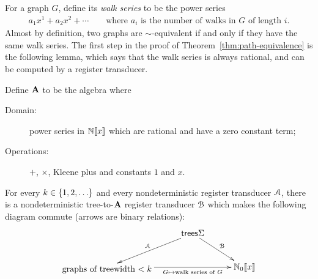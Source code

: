 For a graph $G$, define its \emph{walk series} to be the power series 
\begin{align*}
  a_1 x^1 + a_2x^2 + \cdots \qquad \text{where $a_i$ is the number of walks in $G$ of length $i$.}
\end{align*}
Almost by definition, two graphs are $\sim$-equivalent if and only if they have the same walk series. 
The first step in the proof of Theorem~\ref{thm:path-equivalence} is the following lemma, which says  that the walk series is always  rational, and can be computed by a register transducer.
\begin{lemma}\label{lem:compute-power-series}    
    Define  $\mathbf{A}$ to be the  algebra where
    \begin{description}
        \item[Domain:]power series in $\mathbb N [\![x]\!]$ which are rational and have a  zero constant term;
        \item[Operations:] $+$, $\times$, Kleene plus and constants $1$ and $x$.
    \end{description}
    For every $k \in \{1,2,\ldots\}$ and every nondeterministic   register transducer ${\mathcal A}$, there is a nondeterministic tree-to-$\mathbf{A}$ register transducer ${\mathcal B}$ which makes the following diagram commute (arrows are binary relations):
    \begin{align*}
    \xymatrix@C=1cm{
       &  \trees \Sigma   
        \ar[dr]^{\Bb}
        \ar[dl]_{\Aa} \\
        \txt{graphs of
        treewidth $< k$} \ar[rr]_-{G \mapsto \text{walk series of $G$}}& & \natx
    }
    \end{align*}
\end{lemma}
